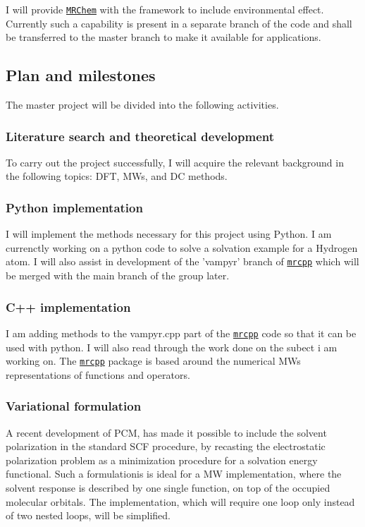 \documentclass[a4paper,11pt]{article}
\newcommand{\mrchem}{\href{https://mrchem.readthedocs.io/en/latest/}{\texttt{MRChem}}}
\newcommand{\mrcpp}{\href{https://mrcpp.readthedocs.io/en/latest/}{\texttt{mrcpp}}}
\begin{document}
I will provide \mrchem{} with the
framework to include environmental effect. Currently such a capability
is present in a separate branch of the code and shall be transferred
to the master branch to make it available for applications.

\subsection{Plan and milestones}

The master project will be divided into the following activities.

\subsubsection{Literature search and theoretical development}

To carry out the project successfully, I will acquire the relevant
background in the following topics: \acl{DFT}, \aclp{MW}, and \acl{DC}
methods.

\subsubsection{Python implementation}

I will implement the methods necessary for this project using Python.
I am currenctly working on a python code to solve a solvation example
for a Hydrogen atom. I will also assist in development of the 'vampyr'
branch of \mrcpp{} which will be merged with the main branch of the group
later.

\subsubsection{C++ implementation}
I am adding methods to the vampyr.cpp part of the \mrcpp{} code so
that it can be used with python. I will also read through the work
done on the subect i am working on. The \mrcpp{} package is based
around the numerical \aclp{MW} representations of functions and
operators.

\subsubsection{Variational formulation}

A recent development of \ac{PCM}, has made it possible to include the
solvent polarization in the standard
\ac{SCF} procedure, by recasting the electrostatic polarization
problem as a minimization procedure for a solvation energy
functional\cite{Lipparini:2010bg}. Such a formulationis is 
ideal for a
\ac{MW} implementation, where the solvent response is described by one
single function, on top of the occupied molecular
orbitals. The implementation, which
will require one loop only instead of two nested loops, will be simplified.
\end{document}
